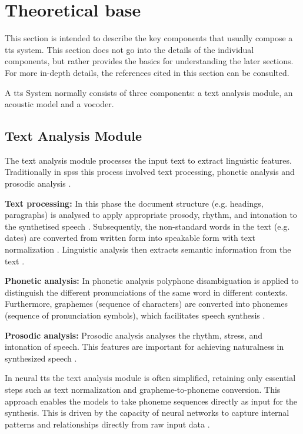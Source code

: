 \newpage
\section{Theoretical base}
This section is intended to describe the key components that usually compose a \gls{tts} system. This section does not go into the details of the individual components, but rather provides the basics for understanding the later sections. For more in-depth details, the references cited in this section can be consulted.

A \gls{tts} System normally consists of three components: a text analysis module, an acoustic model and a vocoder.

\subsection{Text Analysis Module}

The text analysis module processes the input text to extract linguistic features. Traditionally in \gls{spss} this process involved text processing, phonetic analysis and prosodic analysis \cite{Tan2023textanalysis}.

\textbf{Text processing:}
In this phase the document structure (e.g. headings, paragraphs) is analysed to apply appropriate prosody, rhythm, and intonation to the synthetised speech \cite{Tan2023textanalysis}. Subsequently, the non-standard words in the text (e.g. dates) are converted from written form into speakable form with text normalization \cite{Tan2023textanalysis, sproat2001normalization}. Linguistic analysis then extracts semantic information from the text \cite{Tan2023textanalysis}.

\textbf{Phonetic analysis:}
In phonetic analysis polyphone disambiguation is applied to distinguish the different pronunciations of the same word in different contexts. Furthermore, graphemes (sequence of characters) are converted into phonemes (sequence of pronunciation symbols), which facilitates speech synthesis \cite{Tan2023textanalysis, sun2019token}.

\textbf{Prosodic analysis:}
Prosodic analysis analyses the rhythm, stress, and intonation of speech. This features are important for achieving naturalness in synthesized speech \cite{Tan2023textanalysis}.

In neural \gls{tts} the text analysis module is often simplified, retaining only essential steps such as text normalization and grapheme-to-phoneme conversion. This approach enables the models to take phoneme sequences directly as input for the synthesis. This is driven by the capacity of neural networks to capture internal patterns and relationships directly from raw input data \cite{Tan2023textanalysis}.


